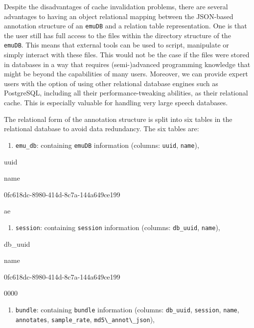 \documentclass[]{book}
\providecommand{\tightlist}{%
  \setlength{\itemsep}{0pt}\setlength{\parskip}{0pt}}
\begin{document}
Despite the disadvantages of cache invalidation problems, there are several advantages to having an object relational mapping between the JSON-based annotation structure of an \texttt{emuDB} and a relation table representation. One is that the user still has full access to the files within the directory structure of the \texttt{emuDB}. This means that external tools can be used to script, manipulate or simply interact with these files. This would not be the case if the files were stored in databases in a way that requires (semi-)advanced programming knowledge that might be beyond the capabilities of many users. Moreover, we can provide expert users with the option of using other relational database engines such as PostgreSQL, including all their performance-tweaking abilities, as their relational cache. This is especially valuable for handling very large speech databases.

The relational form of the annotation structure is split into six tables in the relational database to avoid data redundancy. The six tables are:

\begin{enumerate}
\def\labelenumi{\arabic{enumi}.}
\tightlist
\item
  \texttt{emu\_db}: containing \texttt{emuDB} information (columns: \texttt{uuid}, \texttt{name}),
\end{enumerate}

uuid

name

0fc618dc-8980-414d-8c7a-144a649ce199

ae

\begin{enumerate}
\def\labelenumi{\arabic{enumi}.}
\setcounter{enumi}{1}
\tightlist
\item
  \texttt{session}: containing \texttt{session} information (columns: \texttt{db\_uuid}, \texttt{name}),
\end{enumerate}

db\_uuid

name

0fc618dc-8980-414d-8c7a-144a649ce199

0000

\begin{enumerate}
\def\labelenumi{\arabic{enumi}.}
\setcounter{enumi}{2}
\tightlist
\item
  \texttt{bundle}: containing \texttt{bundle} information (columns: \texttt{db\_uuid}, \texttt{session}, \texttt{name}, \texttt{annotates}, \texttt{sample\_rate}, \texttt{md5\textbackslash{}\_annot\textbackslash{}\_json}),
\end{enumerate}
\end{document}
